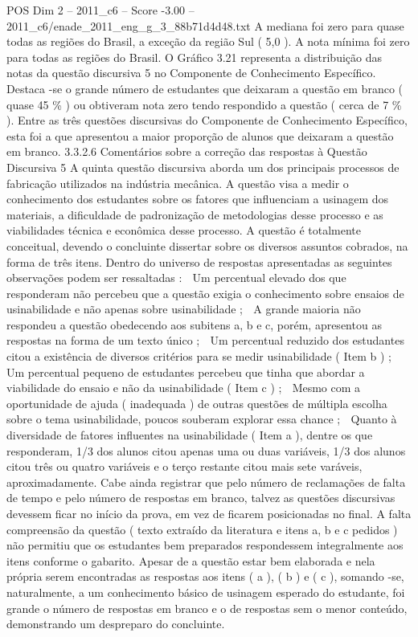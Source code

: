\begin{textsample}{POS Dim 2 – 2011\_c6 – Score -3.00 – 2011\_c6/enade\_2011\_eng\_g\_3\_88b71d4d48.txt}
A mediana foi zero para quase todas as regiões do Brasil, a exceção da região Sul ( 5,0 ).
A nota mínima foi zero para todas as regiões do Brasil.
O Gráfico 3.21 representa a distribuição das notas da questão discursiva 5 no Componente de Conhecimento Específico.
Destaca -se o grande número de estudantes que deixaram a questão em branco ( quase 45 \% ) ou obtiveram nota zero tendo respondido a questão ( cerca de 7 \% ).
Entre as três questões discursivas do Componente de Conhecimento Específico, esta foi a que apresentou a maior proporção de alunos que deixaram a questão em branco. 3.3.2.6 Comentários sobre a correção das respostas à Questão Discursiva 5 A quinta questão discursiva aborda um dos principais processos de fabricação utilizados na indústria mecânica.
A questão visa a medir o conhecimento dos estudantes sobre os fatores que influenciam a usinagem dos materiais, a dificuldade de padronização de metodologias desse processo e as viabilidades técnica e econômica desse processo.
A questão é totalmente conceitual, devendo o concluinte dissertar sobre os diversos assuntos cobrados, na forma de três itens.
Dentro do universo de respostas apresentadas as seguintes observações podem ser ressaltadas :  Um percentual elevado dos que responderam não percebeu que a questão exigia o conhecimento sobre ensaios de usinabilidade e não apenas sobre usinabilidade ;  A grande maioria não respondeu a questão obedecendo aos subitens a, b e c, porém, apresentou as respostas na forma de um texto único ;  Um percentual reduzido dos estudantes citou a existência de diversos critérios para se medir usinabilidade ( Item b ) ;  Um percentual pequeno de estudantes percebeu que tinha que abordar a viabilidade do ensaio e não da usinabilidade ( Item c ) ;  Mesmo com a oportunidade de ajuda ( inadequada ) de outras questões de múltipla escolha sobre o tema usinabilidade, poucos souberam explorar essa chance ;  Quanto à diversidade de fatores influentes na usinabilidade ( Item a ), dentre os que responderam, 1/3 dos alunos citou apenas uma ou duas variáveis, 1/3 dos alunos citou três ou quatro variáveis e o terço restante citou mais sete varáveis, aproximadamente.
Cabe ainda registrar que pelo número de reclamações de falta de tempo e pelo número de respostas em branco, talvez as questões discursivas devessem ficar no início da prova, em vez de ficarem posicionadas no final.
A falta compreensão da questão ( texto extraído da literatura e itens a, b e c pedidos ) não permitiu que os estudantes bem preparados respondessem integralmente aos itens conforme o gabarito.
Apesar de a questão estar bem elaborada e nela própria serem encontradas as respostas aos itens ( a ), ( b ) e ( c ), somando -se, naturalmente, a um conhecimento básico de usinagem esperado do estudante, foi grande o número de respostas em branco e o de respostas sem o menor conteúdo, demonstrando um despreparo do concluinte.

\end{textsample}
